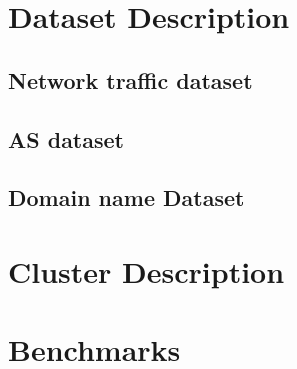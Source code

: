 \section{Dataset Description}
\subsection{Network traffic dataset}


\subsection{AS dataset}



\subsection{Domain name Dataset}



\section{Cluster Description}



\section{Benchmarks}



\cleardoublepage
